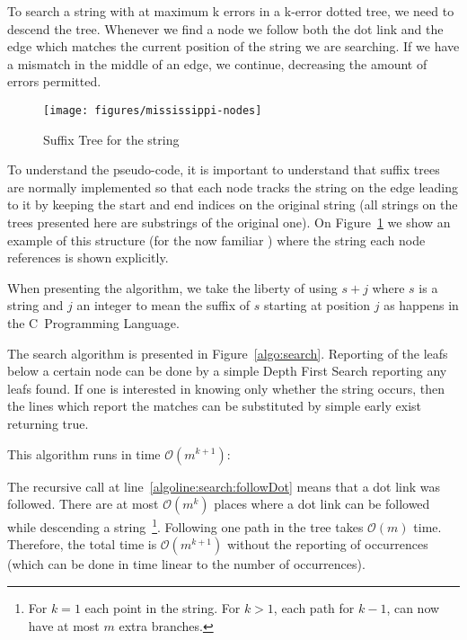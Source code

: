 To search a string with at maximum k errors in a k-error dotted tree, we need to descend the tree. Whenever we find a node we follow both the dot link and the edge which matches the current position of the string we are searching. If we have a mismatch in the middle of an edge, we continue, decreasing the amount of errors permitted.

\begin{figure}
\texttt{[image: figures/mississippi-nodes]}
\caption{Suffix Tree for the string }%
\label{fig:mississippi-nodes}
\end{figure}

To understand the pseudo-code, it is important to understand that suffix trees are normally implemented so that each node tracks the string on the edge leading to it by keeping the start and end indices on the original string (all strings on the trees presented here are substrings of the original one). On Figure~\ref{fig:mississippi-nodes} we show an example of this structure (for the now familiar ) where the string each node references is shown explicitly.

When presenting the algorithm, we take the liberty of using $s+j$ where $s$ is a string and $j$ an integer to mean the suffix of $s$ starting at position $j$ as happens in the C~Programming Language.



The search algorithm is presented in Figure~\ref{algo:search}. Reporting of the leafs below a certain node can be done by a simple Depth First Search reporting any leafs found. If one is interested in knowing only whether the string occurs, then the lines which report the matches can be substituted by simple early exist returning true.

This algorithm runs in time $\mathcal{O}(m^{k+1})$:

The recursive call at line~\ref{algoline:search:followDot} means that a dot link was followed. There are at most $\mathcal{O}(m^k)$ places where a dot link can be followed while descending a string~\footnote{For $k=1$ each point in the string. For $k>1$, each path for $k-1$, can now have at most $m$ extra branches.}. Following one path in the tree takes $\mathcal{O}(m)$ time. Therefore, the total time is $\mathcal{O}(m^{k+1})$ without the reporting of occurrences (which can be done in time linear to the number of occurrences).
